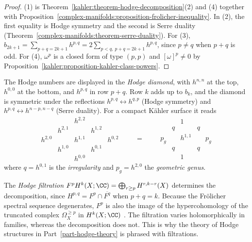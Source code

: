 \begin{proof}
(1) is Theorem~\ref{kahler:theorem-hodge-decomposition}(2) and (4) together with
Proposition~\ref{complex-manifolds:proposition-frolicher-inequality}. In (2), the first equality is Hodge symmetry and the second is Serre duality
(Theorem~\ref{complex-manifolds:theorem-serre-duality}). For (3), $b_{2k+1} = \sum_{p+q=2k+1}h^{p,q} = 2\sum_{p<q,\ p+q=2k+1}h^{p,q}$, since
$p \neq q$ when $p + q$ is odd. For (4), $\omega^p$ is a closed form of type $(p,p)$ and $[\omega]^p \neq 0$ by
Proposition~\ref{kahler:proposition-kahler-class-powers}.
\end{proof}

\begin{remark}\label{kahler:remark-hodge-diamond}
The Hodge numbers are displayed in the \emph{Hodge diamond}, with $h^{n,n}$ at the top, $h^{0,0}$ at the bottom, and $h^{p,q}$ in row
$p + q$. Row $k$ adds up to $b_k$, and the diamond is symmetric under the reflections $h^{p,q} \leftrightarrow h^{q,p}$ (Hodge symmetry) and
$h^{p,q} \leftrightarrow h^{n-p,n-q}$ (Serre duality). For a compact K\"ahler surface it reads
\[
\begin{array}{ccccc}
 & & h^{2,2} & & \\
 & h^{2,1} & & h^{1,2} & \\
h^{2,0} & & h^{1,1} & & h^{0,2} \\
 & h^{1,0} & & h^{0,1} & \\
 & & h^{0,0} & &
\end{array}
\qquad = \qquad
\begin{array}{ccccc}
 & & 1 & & \\
 & q & & q & \\
p_g & & h^{1,1} & & p_g \\
 & q & & q & \\
 & & 1 & &
\end{array}
\]
where $q = h^{0,1}$ is the \emph{irregularity} and $p_g = h^{2,0}$ the \emph{geometric genus}.
\end{remark}

\begin{remark}\label{kahler:remark-hodge-filtration}
The \emph{Hodge filtration} $F^pH^k(X; \CC) = \bigoplus_{r \geq p}H^{r,k-r}(X)$ determines the decomposition, since
$H^{p,q} = F^p \cap \overline{F^q}$ when $p + q = k$. Because the Fr\"olicher spectral sequence degenerates, $F^p$ is also the image of the
hypercohomology of the truncated complex $\Omega^{\geq p}_X$ in $H^k(X; \CC)$ \cite[Chapter 8]{voisin-hodge-1}. The filtration varies
holomorphically in families, whereas the decomposition does not. This is why the theory of Hodge structures in
Part~\ref{part-hodge-theory} is phrased with filtrations.
\end{remark}


